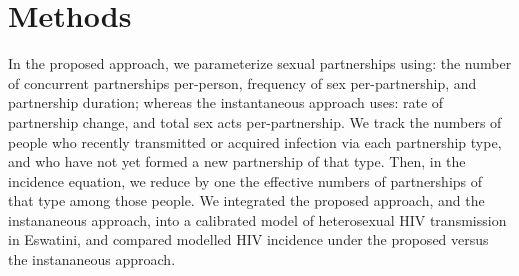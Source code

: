 \section{Methods}
In the proposed approach, we parameterize sexual partnerships using:
the number of concurrent partnerships per-person, frequency of sex per-partnership, and partnership duration;
whereas the instantaneous approach uses:
rate of partnership change, and total sex acts per-partnership.
We track the numbers of people
who recently transmitted or acquired infection via each partnership type, and
who have not yet formed a new partnership of that type.
Then, in the incidence equation, we reduce by one
the effective numbers of partnerships of that type among those people.
We integrated the proposed approach, and the instananeous approach,
into a calibrated model of heterosexual HIV transmission in Eswatini,
and compared modelled HIV incidence under the proposed versus the instananeous approach.

